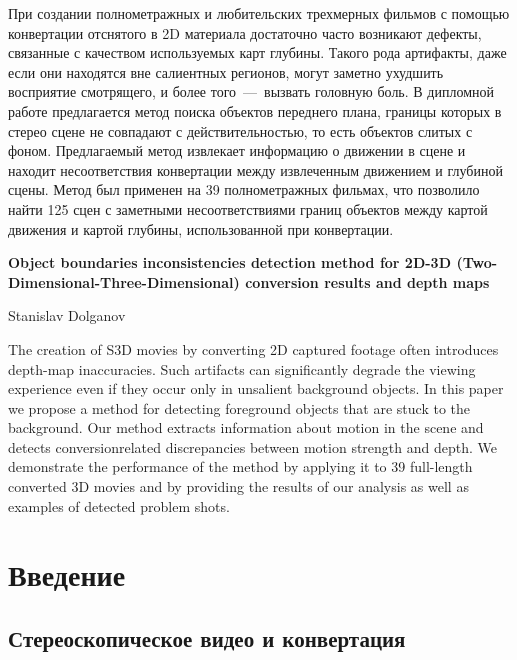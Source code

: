 \documentclass[14pt, a4paper]{extarticle}
\begin{document}
При создании полнометражных и любительских трехмерных фильмов с помощью 
конвертации отснятого в 2D материала достаточно часто возникают дефекты, 
связанные с качеством используемых карт глубины. Такого рода артифакты, 
даже если они находятся вне салиентных регионов,  могут заметно ухудшить 
восприятие смотрящего, и более того~---~вызвать головную боль. В дипломной
работе предлагается метод поиска объектов переднего плана, границы которых 
в стерео сцене не совпадают с действительностью, то есть объектов слитых 
с фоном. Предлагаемый метод извлекает информацию о движении в сцене и 
находит несоответствия конвертации между извлеченным движением и глубиной сцены.
Метод был применен на 39 полнометражных фильмах, что позволило найти 125 сцен 
с заметными несоответствиями границ объектов между картой движения и картой глубины, 
использованной при конвертации.

\vspace{2cm}

\textbf{Object boundaries inconsistencies detection method 
for 2D-3D (Two-Dimensional-Three-Dimensional)
conversion results and depth maps}

\vspace{0.5cm}
Stanislav Dolganov
\vspace{0.5cm}

The creation of S3D movies by converting 2D captured footage
often introduces depth-map inaccuracies. Such artifacts can
significantly degrade the viewing experience even if they occur
only in unsalient background objects.
In this paper we propose a method for detecting foreground
objects that are stuck to the background. Our method extracts
information about motion in the scene and detects conversionrelated
discrepancies between motion strength and depth. We
demonstrate the performance of the method by applying it
to 39 full-length converted 3D movies and by providing the
results of our analysis as well as examples of detected problem
shots.

\newpage
{}
\tableofcontents

\newpage
\section{Введение}

\subsection{Стереоскопическое видео и конвертация}
\end{document}
